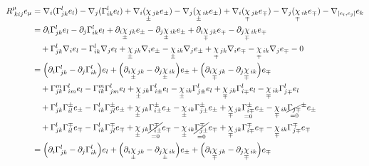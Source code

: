 \documentclass[a4paper,11pt]{article}
\numberwithin{equation}{section}
\theoremstyle{definition}
\begin{document}
\begin{align*}
    R^\mu_{\;kij}e_\mu &= \nabla_i(\Gamma_{jk}^l e_l) - \nabla_j(\Gamma_{ik}^l e_l) + \nabla_i(\underset{\pm}{\chi}\,_{jk} e_\pm) - \nabla_j(\underset{\pm}{\chi}\,_{ik} e_\pm) + \nabla_i(\underset{\mp}{\chi}\,_{jk} e_\mp) -\nabla_j(\underset{\mp}{\chi}\,_{ik} e_\mp) - \nabla_{[e_i,e_j]}e_k\\
    &= \partial_i\Gamma_{jk}^l e_l - \partial_j\Gamma_{ik}^l e_l + \partial_i\underset{\pm}{\chi}\,_{jk} e_\pm - \partial_j\underset{\pm}{\chi}\,_{ik} e_\pm + \partial_i\underset{\mp}{\chi}\,_{jk} e_\mp -\partial_j\underset{\mp}{\chi}\,_{ik} e_\mp\\
    &\quad + \Gamma_{jk}^l\nabla_ie_l - \Gamma_{ik}^l\nabla_je_l + \underset{\pm}{\chi}\,_{jk}\nabla_ie_\pm - \underset{\pm}{\chi}\,_{ik}\nabla_je_\pm + \underset{\mp}{\chi}\,_{jk}\nabla_ie_\mp - \underset{\mp}{\chi}\,_{ik}\nabla_je_\mp - 0\\
    &= \Big(\partial_i\Gamma_{jk}^l - \partial_j\Gamma_{ik}^l \Big) e_l + \Big( \partial_i\underset{\pm}{\chi}\,_{jk} - \partial_j\underset{\pm}{\chi}\,_{ik} \Big) e_\pm + \Big( \partial_i\underset{\mp}{\chi}\,_{jk} -\partial_j\underset{\mp}{\chi}\,_{ik} \Big) e_\mp\\
    &\quad + \Gamma_{jk}^m\Gamma_{im}^l e_l - \Gamma_{ik}^m\Gamma_{jm}^l e_l + \underset{\pm}{\chi}\,_{jk}\Gamma_{i\pm}^l e_l - \underset{\pm}{\chi}\,_{ik}\Gamma_{j\pm}^l e_l + \underset{\mp}{\chi}\,_{jk}\Gamma_{i\mp}^l e_l - \underset{\mp}{\chi}\,_{ik}\Gamma_{j\mp}^l e_l\\
    &\quad + \Gamma_{jk}^l\Gamma_{il}^\pm e_\pm - \Gamma_{ik}^l\Gamma_{jl}^\pm e_\pm + \underset{\pm}{\chi}\,_{jk}\Gamma_{i\pm}^\pm e_\pm - \underset{\pm}{\chi}\,_{ik}\Gamma_{j\pm}^\pm e_\pm + \underset{\mp}{\chi}\,_{jk}\underset{=0}{\Gamma_{i\mp}^\pm} e_\pm - \underset{\mp}{\chi}\,_{ik}\underset{=0}{\cancel{\Gamma_{j\mp}}}^\pm e_\pm\\
    &\quad + \Gamma_{jk}^l\Gamma_{il}^\mp e_\mp - \Gamma_{ik}^l\Gamma_{jl}^\mp e_\mp + \underset{\pm}{\chi}\,_{jk}\underset{=0}{\cancel{\Gamma_{i\pm}^\mp}} e_\mp - \underset{\pm}{\chi}\,_{ik}\underset{=0}{\cancel{\Gamma_{j\pm}^\mp}} e_\mp + \underset{\mp}{\chi}\,_{jk}\Gamma_{i\mp}^\mp e_\mp - \underset{\mp}{\chi}\,_{ik}\Gamma_{j\mp}^\mp e_\mp\\
    &= \Big(\partial_i\Gamma_{jk}^l - \partial_j\Gamma_{ik}^l \Big) e_l + \Big( \partial_i\underset{\pm}{\chi}\,_{jk} - \partial_j\underset{\pm}{\chi}\,_{ik} \Big) e_\pm + \Big( \partial_i\underset{\mp}{\chi}\,_{jk} -\partial_j\underset{\mp}{\chi}\,_{ik} \Big) e_\mp\\

\end{align*}
\end{document}
